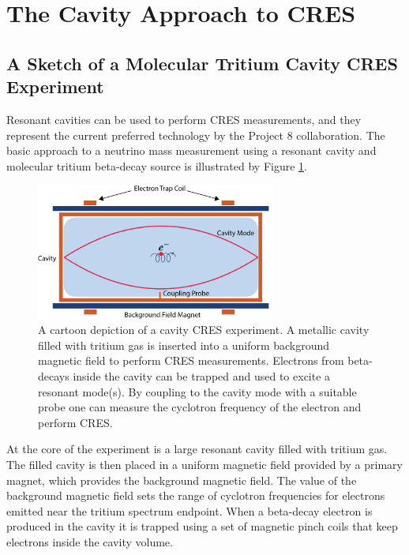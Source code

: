 \section{The Cavity Approach to CRES}
\label{sec:chap6-cavity-approach}

\subsection{A Sketch of a Molecular Tritium Cavity CRES Experiment}

Resonant cavities can be used to perform CRES measurements, and they represent the current preferred technology by the Project 8 collaboration. The basic approach to a neutrino mass measurement using a resonant cavity and molecular tritium beta-decay source is illustrated by Figure \ref{fig:chap6-cav-cartoon}.
\begin{figure}[htbp]
    \centering
    \includegraphics*[width=0.7\textwidth]{figs/Chapter-6/230606_cavity_cartoon.png}
    \caption{\label{fig:chap6-cav-cartoon} A cartoon depiction of a cavity CRES experiment. A metallic cavity filled with tritium gas is inserted into a uniform background magnetic field to perform CRES measurements. Electrons from beta-decays inside the cavity can be trapped and used to excite a resonant mode(s). By coupling to the cavity mode with a suitable probe one can measure the cyclotron frequency of the electron and perform CRES. }
\end{figure}

At the core of the experiment is a large resonant cavity filled with tritium gas. The filled cavity is then placed in a uniform magnetic field provided by a primary magnet, which provides the background magnetic field. The value of the background magnetic field sets the range of cyclotron frequencies for electrons emitted near the tritium spectrum endpoint. When a beta-decay electron is produced in the cavity it is trapped using a set of magnetic pinch coils that keep electrons inside the cavity volume.


